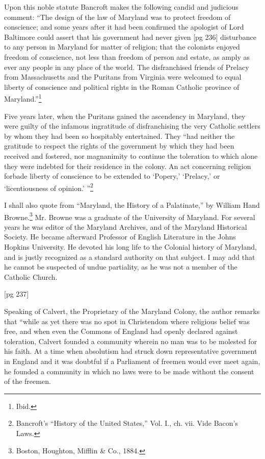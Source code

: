 Upon this noble statute Bancroft makes the following
candid and judicious comment: “The design
of the law of Maryland was to protect freedom
of conscience; and some years after it had
been confirmed the apologist of Lord Baltimore
could assert that his government had never given
[pg 236]
disturbance to any person in Maryland for matter
of religion; that the colonists enjoyed freedom
of conscience, not less than freedom of person and
estate, as amply as ever any people in any place
of the world. The disfranchised friends of Prelacy
from Massachusetts and the Puritans from
Virginia were welcomed to equal liberty of conscience
and political rights in the Roman Catholic
province of Maryland.”\footnote{Ibid.}

Five years later, when the Puritans gained the
ascendency in Maryland, they were guilty of the
infamous ingratitude of disfranchising the very
Catholic settlers by whom they had been so hospitably
entertained. They “had neither the gratitude
to respect the rights of the government by
which they had been received and fostered, nor
magnanimity to continue the toleration to which
alone they were indebted for their residence in the
colony. An act concerning religion forbade liberty
of conscience to be extended to ‘Popery,’
‘Prelacy,’ or ‘licentiousness of opinion.’ ”\footnote{Bancroft's
“History of the United States,” Vol. I., ch. vii.
Vide Bacon's Laws.}

I shall also quote from “Maryland, the History
of a Palatinate,” by William Hand Browne.\footnote{Boston,
Houghton, Mifflin \& Co., 1884.} Mr.
Browne was a graduate of the University of Maryland.
For several years he was editor of the Maryland
Archives, and of the Maryland Historical Society.
He became afterward Professor of English
Literature in the Johns Hopkins University. He
devoted his long life to the Colonial history of
Maryland, and is justly recognized as a standard
authority on that subject. I may add that he cannot
be suspected of undue partiality, as he was not
a member of the Catholic Church.

[pg 237]

Speaking of Calvert, the Proprietary of the
Maryland Colony, the author remarks that “while
as yet there was no spot in Christendom where religious
belief was free, and when even the Commons
of England had openly declared against toleration,
Calvert founded a community wherein no
man was to be molested for his faith. At a time
when absolutism had struck down representative
government in England and it was doubtful if a
Parliament of freemen would ever meet again, he
founded a community in which no laws were to be
made without the consent of the freemen.

